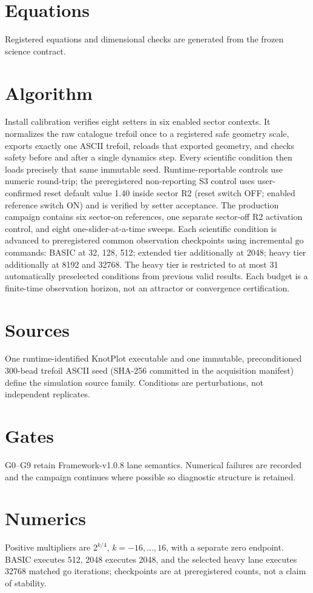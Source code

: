 \documentclass[11pt,a4paper]{article}
\begin{document}
\section{Equations}
Registered equations and dimensional checks are generated from the frozen science contract.
\section{Algorithm}
Install calibration verifies eight setters in six enabled sector contexts. It normalizes the raw catalogue trefoil once to a registered safe geometry scale, exports exactly one ASCII trefoil, reloads that exported geometry, and checks safety before and after a single dynamics step. Every scientific condition then loads precisely that same immutable seed. Runtime-reportable controls use numeric round-trip; the preregistered non-reporting S3 control uses user-confirmed reset default value 1.40 inside sector R2 (reset switch OFF; enabled reference switch ON) and is verified by setter acceptance. The production campaign contains six sector-on references, one separate sector-off R2 activation control, and eight one-slider-at-a-time sweeps. Each scientific condition is advanced to preregistered common observation checkpoints using incremental $\mathrm{go}$ commands: BASIC at 32, 128, 512; extended tier additionally at 2048; heavy tier additionally at 8192 and 32768. The heavy tier is restricted to at most 31 automatically preselected conditions from previous valid results. Each budget is a finite-time observation horizon, not an attractor or convergence certification.

\section{Sources}
One runtime-identified KnotPlot executable and one immutable, preconditioned 300-bead trefoil ASCII seed (SHA-256 committed in the acquisition manifest) define the simulation source family. Conditions are perturbations, not independent replicates.
\section{Gates}
G0--G9 retain Framework-v1.0.8 lane semantics. Numerical failures are recorded and the campaign continues where possible so diagnostic structure is retained.
\section{Numerics}
Positive multipliers are $2^{k/4}$, $k=-16,\ldots,16$, with a separate zero endpoint. BASIC executes 512, 2048 executes 2048, and the selected heavy lane executes 32768 matched go iterations; checkpoints are at preregistered counts, not a claim of stability.
\end{document}
